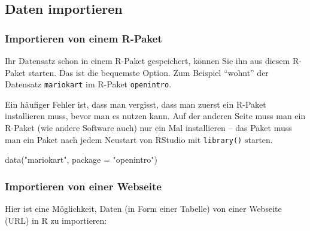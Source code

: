 \documentclass[
  a4paper,
  DIV=11]{scrreprt}
\newenvironment{Shaded}{\begin{snugshade}}{\end{snugshade}}
\newcommand{\AttributeTok}[1]{\textcolor[rgb]{0.40,0.45,0.13}{#1}}
\newcommand{\FunctionTok}[1]{\textcolor[rgb]{0.28,0.35,0.67}{#1}}
\newcommand{\NormalTok}[1]{\textcolor[rgb]{0.00,0.23,0.31}{#1}}
\newcommand{\StringTok}[1]{\textcolor[rgb]{0.13,0.47,0.30}{#1}}
\theoremstyle{definition}
\theoremstyle{definition}
\theoremstyle{definition}
\theoremstyle{remark}
\begin{document}
\subsection{Daten importieren}\label{daten-importieren}

\subsubsection{Importieren von einem
R-Paket}\label{importieren-von-einem-r-paket}

Ihr Datensatz schon in einem R-Paket gespeichert, können Sie ihn aus
diesem R-Paket starten. Das ist die bequemste Option. Zum Beispiel
``wohnt'' der Datensatz \texttt{mariokart} im R-Paket
\texttt{openintro}.

\begin{tcolorbox}[enhanced jigsaw, leftrule=.75mm, opacitybacktitle=0.6, colback=white, colframe=quarto-callout-tip-color-frame, coltitle=black, colbacktitle=quarto-callout-tip-color!10!white, opacityback=0, left=2mm, breakable, titlerule=0mm, toptitle=1mm, bottomtitle=1mm, rightrule=.15mm, title=\textcolor{quarto-callout-tip-color}{\faLightbulb}\hspace{0.5em}{Tipp}, arc=.35mm, bottomrule=.15mm, toprule=.15mm]

Ein häufiger Fehler ist, dass man vergisst, dass man zuerst ein R-Paket
installieren muss, bevor man es nutzen kann. Auf der anderen Seite muss
man ein R-Paket (wie andere Software auch) nur ein Mal installieren --
das Paket muss man ein Paket nach jedem Neustart von RStudio mit
\texttt{library()} starten.

\end{tcolorbox}

\begin{Shaded}
\begin{Highlighting}[]
\FunctionTok{data}\NormalTok{(}\StringTok{"mariokart"}\NormalTok{, }\AttributeTok{package =} \StringTok{"openintro"}\NormalTok{)}
\end{Highlighting}
\end{Shaded}

\subsubsection{Importieren von einer
Webseite}\label{importieren-von-einer-webseite}

Hier ist eine Möglichkeit, Daten (in Form einer Tabelle) von einer
Webseite (URL) in R zu importieren:
\end{document}
